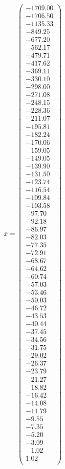 \documentclass[a4paper,12pt]{article}
\begin{document}
$\bar { x } = \begin{pmatrix}
-1709.00 \\
-1706.50 \\
-1135.33 \\
-849.25 \\
-677.20 \\
-562.17 \\
-479.71 \\
-417.62 \\
-369.11 \\
-330.10 \\
-298.00 \\
-271.08 \\
-248.15 \\
-228.36 \\
-211.07 \\
-195.81 \\
-182.24 \\
-170.06 \\
-159.05 \\
-149.05 \\
-139.90 \\
-131.50 \\
-123.74 \\
-116.54 \\
-109.84 \\
-103.58 \\
-97.70 \\
-92.18 \\
-86.97 \\
-82.03 \\
-77.35 \\
-72.91 \\
-68.67 \\
-64.62 \\
-60.74 \\
-57.03 \\
-53.46 \\
-50.03 \\
-46.72 \\
-43.53 \\
-40.44 \\
-37.45 \\
-34.56 \\
-31.75 \\
-29.02 \\
-26.37 \\
-23.79 \\
-21.27 \\
-18.82 \\
-16.42 \\
-14.08 \\
-11.79 \\
-9.55 \\
-7.35 \\
-5.20 \\
-3.09 \\
-1.02 \\
1.02 \\
\end{pmatrix}
$
\end{document}
